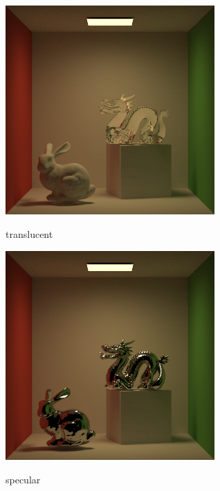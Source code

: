 \documentclass[acmtog]{acmart}
\begin{document}
\begin{figure}[h]
	\centering
	{\includegraphics[width=8cm]{result2.png}}
	\caption{translucent}	
\end{figure}
\begin{figure}[h]
	\centering
	{\includegraphics[width=8cm]{result.png}}
	\caption{specular}	
\end{figure}
\end{document}
